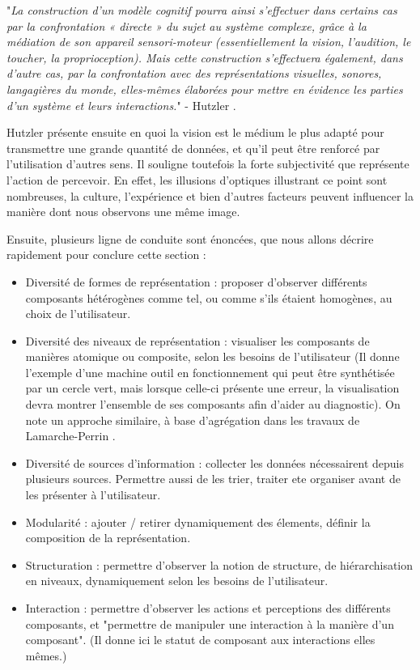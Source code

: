 		"\textit{La construction d'un modèle cognitif pourra ainsi s'effectuer dans certains cas par la confrontation « directe » du sujet au système complexe, grâce à la médiation de son appareil sensori-moteur (essentiellement la vision, l'audition, le toucher, la proprioception). Mais cette construction s'effectuera également, dans d'autre cas, par la confrontation avec des représentations visuelles, sonores, langagières du monde, elles-mêmes élaborées pour mettre en évidence les parties d'un système et leurs interactions.}" - Hutzler \cite{hutzler_du_2000}.
		
		Hutzler présente ensuite en quoi la vision est le médium le plus adapté pour transmettre une grande quantité de données, et qu'il peut être renforcé par l'utilisation d'autres sens. Il souligne toutefois la forte subjectivité que représente l'action de percevoir. En effet, les illusions d'optiques illustrant ce point sont nombreuses, la culture, l'expérience et bien d'autres facteurs peuvent influencer la manière dont nous observons une même image.
		
		Ensuite, plusieurs ligne de conduite sont énoncées, que nous allons décrire rapidement pour conclure cette section :
		\begin{itemize}
			\item Diversité de formes de représentation : proposer d'observer différents composants hétérogènes comme tel, ou comme s'ils étaient homogènes, au choix de l'utilisateur.
			\item Diversité des niveaux de représentation : visualiser les composants de manières atomique ou composite, selon les besoins de l'utilisateur (Il donne l'exemple d'une machine outil en fonctionnement qui peut être synthétisée par un cercle vert, mais lorsque celle-ci présente une erreur, la visualisation devra montrer l'ensemble de ses composants afin d'aider au diagnostic). On note un approche similaire, à base d'agrégation dans les travaux de Lamarche-Perrin \cite{lamarche-perrin_analyse_2013}.
			\item Diversité de sources d'information : collecter les données nécessairent depuis plusieurs sources. Permettre aussi de les trier, traiter ete organiser avant de les présenter à l'utilisateur.
			\item Modularité : ajouter / retirer dynamiquement des élements, définir la composition de la représentation.
			\item Structuration : permettre d'observer la notion de structure, de hiérarchisation en niveaux, dynamiquement selon les besoins de l'utilisateur.
			\item Interaction : permettre d'observer les actions et perceptions des différents composants, et "permettre de manipuler une interaction à la manière d'un composant". (Il donne ici le statut de composant aux interactions elles mêmes.)
		\end{itemize}
		
